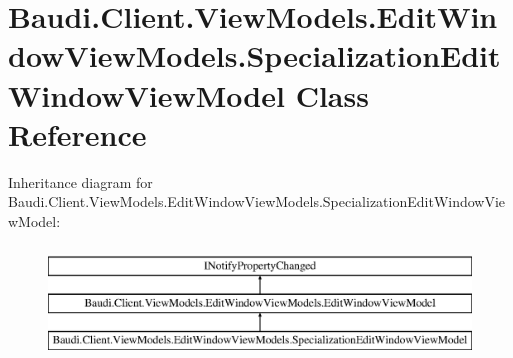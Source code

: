 \hypertarget{class_baudi_1_1_client_1_1_view_models_1_1_edit_window_view_models_1_1_specialization_edit_window_view_model}{}\section{Baudi.\+Client.\+View\+Models.\+Edit\+Window\+View\+Models.\+Specialization\+Edit\+Window\+View\+Model Class Reference}
\label{class_baudi_1_1_client_1_1_view_models_1_1_edit_window_view_models_1_1_specialization_edit_window_view_model}
Inheritance diagram for Baudi.\+Client.\+View\+Models.\+Edit\+Window\+View\+Models.\+Specialization\+Edit\+Window\+View\+Model\+:\begin{figure}[H]
\begin{center}
\leavevmode
\includegraphics[height=3.000000cm]{class_baudi_1_1_client_1_1_view_models_1_1_edit_window_view_models_1_1_specialization_edit_window_view_model}
\end{center}
\end{figure}
